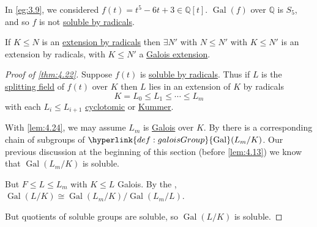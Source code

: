 \documentclass{article}
\DeclareMathOperator{\Gal}{Gal}
\begin{document}
\begin{eg}
    In \cref{eg:3.9}, we considered $f(t) = t^5 - 6t + 3 \in \mathbb{Q}[t]$. $\Gal(f)$ over $\mathbb{Q}$ is $S_5$, and so $f$ is not \hyperlink{def:radicals}{soluble by radicals}.
\end{eg}
\begin{nlemma}\label{lem:4.24}
    If $K \leq N$ is an \hyperlink{def:radicals}{extension by radicals} then $\exists N'$ with $N \leq N'$ with $K \leq N'$ is an extension by radicals, with $K \leq N'$ a \hyperlink{def:galoisExt}{Galois extension}.
\end{nlemma}
\begin{proof}[Proof of \cref{thm:4.22}]
    Suppose $f(t)$ is \hyperlink{def:radicals}{soluble by radicals}.
    Thus if $L$ is the \hyperlink{def:splitting}{splitting field} of $f(t)$ over $K$ then $L$ lies in an extension of $K$ by radicals
    \begin{equation*}
        K = L_0 \leq L_1 \leq \dotsb \leq L_m
    \end{equation*}
    with each $L_i \leq L_{i+1}$ \hyperlink{def:cycloExt}{cyclotomic} or \hyperlink{def:kummerExt}{Kummer}.

    With \cref{lem:4.24}, we may assume $L_m$ is \hyperlink{def:galoisExt}{Galois} over $K$.
    By  there is a corresponding chain of subgroups of $\hyperlink{def:galoisGroup}{\Gal}(L_m/K)$.
    Our previous discussion at the beginning of this section (before \cref{lem:4.13}) we know that $\Gal(L_m/K)$ is soluble.

    But $F \leq L \leq L_m$ with $K \leq L$ Galois.
    By the , $\Gal(L/K) \cong \Gal(L_m/K)/\Gal(L_m/L)$.

    But quotients of soluble groups are soluble, so $\Gal(L/K)$ is soluble.
\end{proof}
\end{document}
